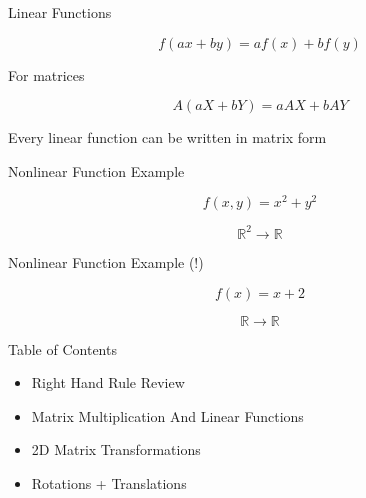 \documentclass{beamer}
\begin{document}
\begin{frame}{Linear Functions}

\[ f(ax + by) = af(x) + bf(y) \]

For matrices

\[ A(aX + bY) = aAX + bAY \]

Every linear function can be written in matrix form

\end{frame}


\begin{frame}{Nonlinear Function Example}

\[ f(x, y) = x^2 + y^2 \]

\[ \mathbb{R}^2 \rightarrow \mathbb{R} \]



\end{frame}


\begin{frame}{Nonlinear Function Example (!)}

\[ f(x) = x + 2 \]

\[ \mathbb{R} \rightarrow \mathbb{R} \]



\end{frame}


\begin{frame}{Table of Contents}

\begin{itemize}[label=$\vartriangleright$]
	\item Right Hand Rule Review
    \item Matrix Multiplication And Linear Functions
\end{itemize}
\begin{itemize}[label=$\blacktriangleright$]
    \item 2D Matrix Transformations
\end{itemize}
\begin{itemize}[label=$\vartriangleright$]
    \item Rotations + Translations
    
\end{itemize}

\end{frame}
\end{document}
